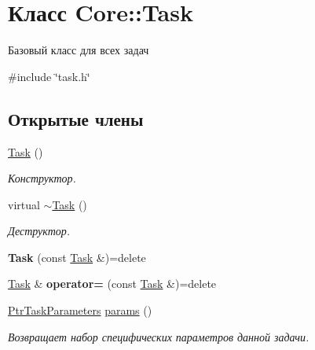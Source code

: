 \hypertarget{class_core_1_1_task}{}\section{Класс Core\+:\+:Task}
\label{class_core_1_1_task}


Базовый класс для всех задач  




{\ttfamily \#include \char`\"{}task.\+h\char`\"{}}

\subsection*{Открытые члены}
\begin{DoxyCompactItemize}
\item 
\hypertarget{class_core_1_1_task_a461b8f90dfed42f5657b927916810e0e}{}\label{class_core_1_1_task_a461b8f90dfed42f5657b927916810e0e} 
\hyperlink{class_core_1_1_task_a461b8f90dfed42f5657b927916810e0e}{Task} ()
\begin{DoxyCompactList}\small\item\em Конструктор. \end{DoxyCompactList}\item 
\hypertarget{class_core_1_1_task_a356b979174846c636ed63a50fab13760}{}\label{class_core_1_1_task_a356b979174846c636ed63a50fab13760} 
virtual \hyperlink{class_core_1_1_task_a356b979174846c636ed63a50fab13760}{$\sim$\+Task} ()
\begin{DoxyCompactList}\small\item\em Деструктор. \end{DoxyCompactList}\item 
\hypertarget{class_core_1_1_task_a1d62812dba83d6a62e1a585c8716b866}{}\label{class_core_1_1_task_a1d62812dba83d6a62e1a585c8716b866} 
{\bfseries Task} (const \hyperlink{class_core_1_1_task}{Task} \&)=delete
\item 
\hypertarget{class_core_1_1_task_a633a445406c96db460ecf7a8538ce96f}{}\label{class_core_1_1_task_a633a445406c96db460ecf7a8538ce96f} 
\hyperlink{class_core_1_1_task}{Task} \& {\bfseries operator=} (const \hyperlink{class_core_1_1_task}{Task} \&)=delete
\item 
\hypertarget{class_core_1_1_task_ac2250776114d414fe0548f089247c347}{}\label{class_core_1_1_task_ac2250776114d414fe0548f089247c347} 
\hyperlink{namespace_core_a3e0e555656bf795146ebb0882e28da2f}{Ptr\+Task\+Parameters} \hyperlink{class_core_1_1_task_ac2250776114d414fe0548f089247c347}{params} ()
\begin{DoxyCompactList}\small\item\em Возвращает набор специфических параметров данной задачи. \end{DoxyCompactList}\item 

\end{DoxyCompactItemize}
